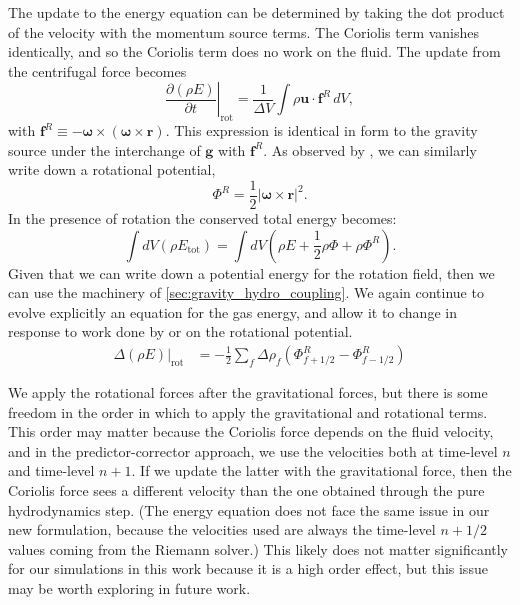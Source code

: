 \documentclass[12pt]{article}
\begin{document}
The update to the energy equation can be determined by taking the dot product of the velocity
with the momentum source terms. The Coriolis term vanishes identically, and so
the Coriolis term does no work on the fluid. The update from the centrifugal force becomes
\begin{equation}
  \left.\frac{\partial(\rho E)}{\partial t}\right|_{\text{rot}} = \frac{1}{\Delta V}\int \rho \mathbf{u} \cdot \mathbf{f}^R\, dV,
\end{equation}
with $\mathbf{f}^R \equiv  -{\bm\omega} \times \left({\bm\omega} \times \mathbf{r}\right)$.
This expression is identical in form to the gravity source under the interchange of $\mathbf{g}$ with $\mathbf{f}^R$.
As observed by \cite{marcello:2012}, we can similarly write down a rotational potential,
\begin{equation}
  \Phi^R = \frac{1}{2} \left| {\bm\omega} \times \mathbf{r} \right|^2.
\end{equation}
In the presence of rotation the conserved total energy becomes:
\begin{equation}
  \int dV (\rho E_{\text{tot}}) = \int dV \left( \rho E + \frac{1}{2} \rho \Phi + \rho \Phi^R \right).
\end{equation}
Given that we can write down a potential energy for the rotation field, then we can use the machinery of
\autoref{sec:gravity_hydro_coupling}. We again continue to evolve explicitly an equation for
the gas energy, and allow it to change in response to work done by or on the rotational potential.
\begin{align}
  \left.\Delta(\rho E)\right|_{\text{rot}} &= -\frac{1}{2}\sum_{f} \Delta \rho_{f} (\Phi^R_{f+1/2} - \Phi^R_{f-1/2})
\end{align}

We apply the rotational forces after the gravitational forces, but
there is some freedom in the order in which to apply the gravitational and rotational terms.
This order may matter because the Coriolis force depends on the fluid velocity, and
in the predictor-corrector approach, we use the velocities both at
time-level $n$ and time-level $n+1$. If we update the latter with the gravitational force,
then the Coriolis force sees a different velocity than the one obtained through the
pure hydrodynamics step. (The energy equation does not face the same issue in our new formulation,
because the velocities used are always the time-level $n+1/2$ values coming from the Riemann solver.)
This likely does not matter significantly for our simulations in this work because it is
a high order effect, but this issue may be worth exploring in future work.
\end{document}
